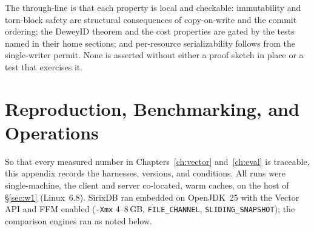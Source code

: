 \documentclass[11pt,a4paper,oneside]{report}
\theoremstyle{sirixthm}
\newcommand{\code}[1]{\texttt{#1}}
\begin{document}
\noindent The through-line is that each property is local and checkable: immutability and torn-block
safety are structural consequences of copy-on-write and the commit ordering; the DeweyID theorem and the
cost properties are gated by the tests named in their home sections; and per-resource serializability
follows from the single-writer permit. None is asserted without either a proof sketch in place or a test
that exercises it.

\chapter{Reproduction, Benchmarking, and Operations}
\label{app:benchmethod}


So that every measured number in Chapters~\ref{ch:vector} and~\ref{ch:eval} is traceable, this appendix
records the harnesses, versions, and conditions. All runs were single-machine, the client and server
co-located, warm caches, on the host of \S\ref{sec:w1} (Linux~6.8). SirixDB ran embedded on OpenJDK~25
with the Vector API and FFM enabled (\code{-Xmx} 4--8\,GB, \code{FILE\_CHANNEL}, \code{SLIDING\_SNAPSHOT});
the comparison engines ran as noted below.
\end{document}

